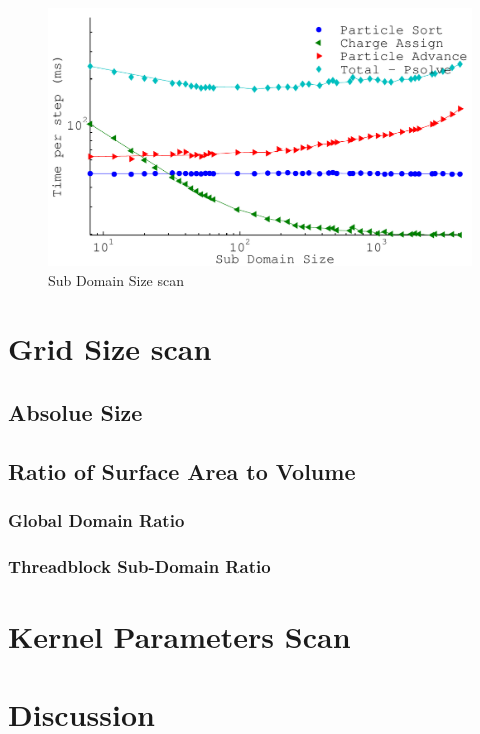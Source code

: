 \begin{figure}
\begin{center}
\includegraphics[width=6in]{performance/gridshape_scan.pdf}
\end{center}
\caption{Sub Domain Size scan}
\label{fig:subdomain_size_scan}
\end{figure}

	
	\section{Grid Size scan}
		\subsection{Absolue Size}
		\subsection{Ratio of Surface Area to Volume}
			\subsubsection{Global Domain Ratio}
			\subsubsection{Threadblock Sub-Domain Ratio}

	\section{Kernel Parameters Scan}

	\section{Discussion}
